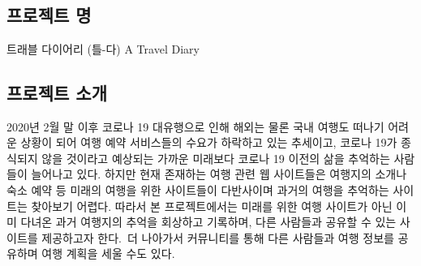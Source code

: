

 \\

\begin{adjustwidth}{0.45cm}{}
\subsection*{프로젝트 명}
\end{adjustwidth}
\begin{adjustwidth}{0.6cm}{}
\large{트래블 다이어리 (틀-다) A Travel Diary}
\normalsize
\end{adjustwidth}

\subsection{프로젝트 소개}
\begin{adjustwidth}{0.6cm}{}
\hspace{1em} 2020년 2월 말 이후 코로나 19 대유행으로 인해 해외는 물론 국내 여행도 떠나기 어려운 상황이 되어 여행 예약 서비스들의 수요가 하락하고 있는 추세이고, 코로나 19가 종식되지 않을 것이라고 예상되는 가까운 미래보다 코로나 19 이전의 삶을 추억하는 사람들이 늘어나고 있다. 하지만 현재 존재하는 여행 관련 웹 사이트들은 여행지의 소개나 숙소 예약 등 미래의 여행을 위한 사이트들이 다반사이며 과거의 여행을 추억하는 사이트는 찾아보기 어렵다. 따라서 본 프로젝트에서는 미래를 위한 여행 사이트가 아닌 이미 다녀온 과거 여행지의 추억을 회상하고 기록하며, 다른 사람들과 공유할 수 있는 사이트를 제공하고자 한다. 더 나아가서 커뮤니티를 통해 다른 사람들과 여행 정보를 공유하며 여행 계획을 세울 수도 있다. 
\end{adjustwidth}

